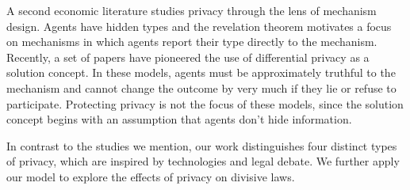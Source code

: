 A second economic literature studies privacy through the lens of mechanism design.  Agents have hidden types and the revelation theorem motivates a focus on mechanisms in which agents report their type directly to the mechanism.  Recently, a set of papers have pioneered the use of differential privacy as a solution concept.  In these models, agents must be approximately truthful to the mechanism and cannot change the outcome by very much if they lie or refuse to participate.  Protecting privacy is not the focus of these models, since the solution concept begins with an assumption that agents don't hide information.

In contrast to the studies we mention, our work distinguishes four distinct types of privacy, which are inspired by technologies and legal debate.  We further apply our model to explore the effects of privacy on divisive laws.



